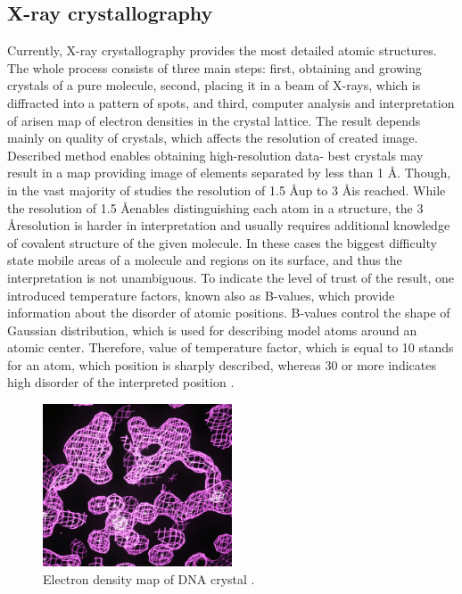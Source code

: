 \subsection{X-ray crystallography} %
Currently, X-ray crystallography provides the most detailed atomic structures. The whole process consists of three main steps: first, obtaining and growing crystals of a pure molecule, second, placing it in a beam of X-rays, which is diffracted into a pattern of spots, and third, computer analysis and interpretation of arisen map of electron densities in the crystal lattice. The result depends mainly on quality of crystals, which affects the resolution of created image. Described method enables obtaining high-resolution data- best crystals may result in a map providing image of elements separated by less than 1 \AA. Though, in the vast majority of studies the resolution of 1.5 \AA up to 3 \AA is reached. While the resolution of 1.5 \AA enables distinguishing each atom in a structure, the 3 \AA resolution is harder in interpretation and usually requires additional knowledge of covalent structure of the given molecule. In these cases the biggest difficulty state mobile areas of a molecule and regions on its surface, and thus the interpretation is not unambiguous. To indicate the level of trust of the result, one introduced temperature factors, known also as B-values, which provide information about the disorder of atomic positions. B-values control the shape of Gaussian distribution, which is used for describing model atoms around an atomic center. Therefore, value of temperature factor, which is equal to 10 stands for an atom, which position is sharply described, whereas 30 or more indicates high disorder of the interpreted position \cite{Goodsell04}.

\begin{figure}[h] 
\centering    
\includegraphics[width=0.5\textwidth]{Figs/xray.jpg}
\caption{Electron density map of DNA crystal \cite{Goodsell04}.}
\label{fig:xray}
\end{figure}

